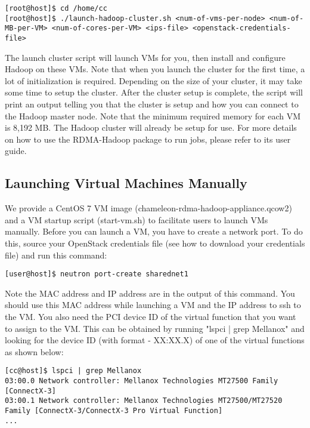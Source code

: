 \begin{verbatim}
[root@host]$ cd /home/cc
[root@host]$ ./launch-hadoop-cluster.sh <num-of-vms-per-node> <num-of-MB-per-VM> <num-of-cores-per-VM> <ips-file> <openstack-credentials-file>
\end{verbatim}

The launch cluster script will launch VMs for you, then install and
configure Hadoop on these VMs. Note that when you launch the cluster
for the first time, a lot of initialization is required. Depending on
the size of your cluster, it may take some time to setup the cluster.
After the cluster setup is complete, the script will print an output
telling you that the cluster is setup and how you can connect to the
Hadoop master node. Note that the minimum required memory for each VM
is 8,192 MB. The Hadoop cluster will already be setup for use. For
more details on how to use the RDMA-Hadoop package to run jobs, please
refer to its user guide.

\subsection{Launching Virtual Machines Manually}

We provide a CentOS 7 VM image (chameleon-rdma-hadoop-appliance.qcow2)
and a VM startup script (start-vm.sh) to facilitate users to launch
VMs manually. Before you can launch a VM, you have to create a network
port. To do this, source your OpenStack credentials file (see how to
download your credentials file) and run this command:

\begin{verbatim}
[user@host]$ neutron port-create sharednet1
\end{verbatim}

Note the MAC address and IP address are in the output of this command.
You should use this MAC address while launching a VM and the IP
address to ssh to the VM. You also need the PCI device ID of the
virtual function that you want to assign to the VM. This can be
obtained by running "lspci | grep Mellanox" and looking for the device
ID (with format - XX:XX.X) of one of the virtual functions as shown
below:

\begin{verbatim}
[cc@host]$ lspci | grep Mellanox
03:00.0 Network controller: Mellanox Technologies MT27500 Family [ConnectX-3]
03:00.1 Network controller: Mellanox Technologies MT27500/MT27520 Family [ConnectX-3/ConnectX-3 Pro Virtual Function]
...
\end{verbatim}

